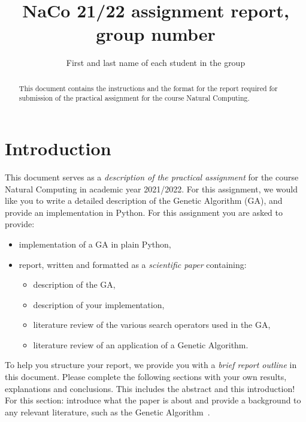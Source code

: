 \documentclass[runningheads]{llncs}
\begin{document}
%
\title{NaCo 21/22 assignment report, group number}
%
%
\author{First and last name of each student in the group}
%
%
%
\maketitle %
%

\begin{abstract}
This document contains the instructions and the format for the report required for submission of the practical assignment for the course Natural Computing. 
\end{abstract}

\section{Introduction}
This document serves as a \textit{description of the practical assignment} for the course Natural Computing in academic year 2021/2022. 
For this assignment, we would like you to write a detailed description of the Genetic Algorithm (GA), and provide an implementation in Python. For this assignment you are asked to provide:
\begin{itemize}
    \item implementation of a GA in plain Python,
    \item report, written and formatted as a \textit{scientific paper} containing:
    \begin{itemize}
        \item description of the GA,
        \item description of your implementation,
        \item literature review of the various search operators used in the GA,
        \item literature review of an application of a Genetic Algorithm.
    \end{itemize}
\end{itemize}

To help you structure your report, we provide you with a \textit{brief report outline} in this document. Please complete the following sections with your own results, explanations and conclusions. This includes the abstract and this introduction! For this section: introduce what the paper is about and provide a background to any relevant literature, such as the Genetic Algorithm~\cite{Holland1975}. 
\end{document}
